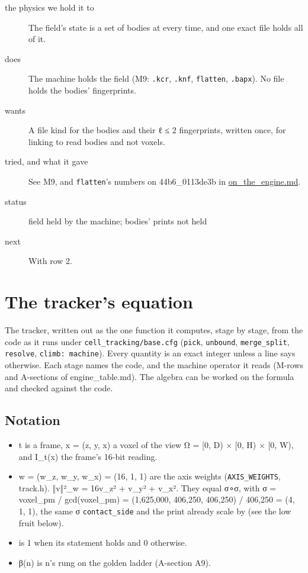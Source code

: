 \begin{description}
\item[{the physics we hold it to}] The field's state is a set of bodies at every time, and one exact file holds all of it.
\item[{does}] The machine holds the field (M9: \texttt{.\allowbreak{}kcr}, \texttt{.\allowbreak{}knf}, \texttt{flatten}, \texttt{.\allowbreak{}bapx}). No file holds the bodies' fingerprints.
\item[{wants}] A file kind for the bodies and their ℓ ≤ 2 fingerprints, written once, for linking to read bodies and not voxels.
\item[{tried, and what it gave}] See M9, and \texttt{flatten}'s numbers on 44b6\_\allowbreak{}0113de3b in \hyperref[chap:on-the-engine]{on\_\allowbreak{}the\_\allowbreak{}engine.md}.
\item[{status}] field held by the machine; bodies' prints not held
\item[{next}] With row 2.
\end{description}

\section{\texorpdfstring{The tracker's equation}{The tracker's equation}}

The tracker, written out as the one function it computes, stage by stage, from the code as it runs under \texttt{cell\_\allowbreak{}tracking/\allowbreak{}base.\allowbreak{}cfg} (\texttt{pick}, \texttt{unbound}, \texttt{merge\_\allowbreak{}split}, \texttt{resolve}, \texttt{climb: machine}). Every quantity is an exact integer unless a line says otherwise. Each stage names the code, and the machine operator it reads (M-rows and A-sections of engine\_\allowbreak{}table.md). The algebra can be worked on the formula and checked against the code.

\subsection{\texorpdfstring{Notation}{Notation}}

\begin{itemize}
\item t is a frame, x = (z, y, x) a voxel of the view Ω = [0, D) × [0, H) × [0, W), and I\_\allowbreak{}t(x) the frame's 16-bit reading.
\item w = (w\_\allowbreak{}z, w\_\allowbreak{}y, w\_\allowbreak{}x) = (16, 1, 1) are the axis weights (\texttt{AXIS\_\allowbreak{}WEIGHTS}, track.h). ‖v‖²\_\allowbreak{}w = 16v\_\allowbreak{}z² + v\_\allowbreak{}y² + v\_\allowbreak{}x². They equal σ∘σ, with σ = voxel\_\allowbreak{}pm / gcd(voxel\_\allowbreak{}pm) = (1,625,000, 406,250, 406,250) / 406,250 = (4, 1, 1), the same σ \texttt{contact\_\allowbreak{}side} and the print already scale by (see the low fruit below).
\item [·] is 1 when its statement holds and 0 otherwise.
\item β(n) is n's rung on the golden ladder (A-section A9).
\end{itemize}


